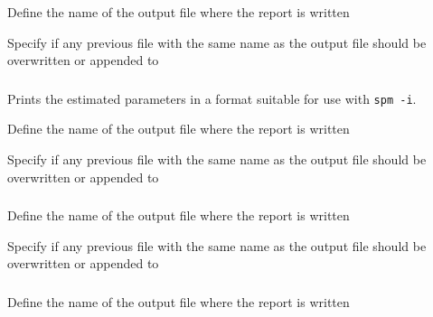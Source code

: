  {Define the name of the output file where the report is written}

 {Specify if any previous file with the same name as the output file should be overwritten or appended to}

\subsubsection[Printing the estimated parameter values out as a vector]{\label{sec:InputFileFormat}}

Prints the estimated parameters in a format suitable for use with \texttt{spm -i}.

 {Define the name of the output file where the report is written}

 {Specify if any previous file with the same name as the output file should be overwritten or appended to}

\subsubsection[Print the objective function values]{}

 {Define the name of the output file where the report is written}

 {Specify if any previous file with the same name as the output file should be overwritten or appended to}

\subsubsection[Print the covariance matrix]{}

 {Define the name of the output file where the report is written}

